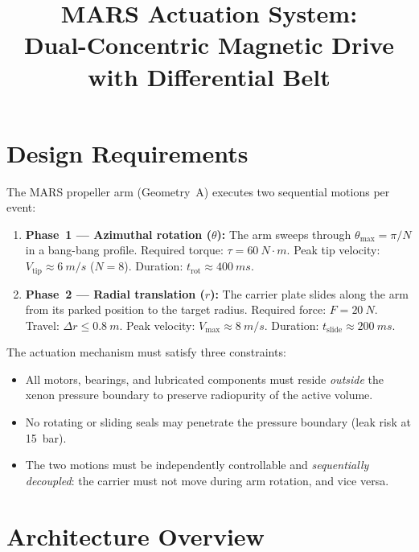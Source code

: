 \documentclass[11pt,a4paper]{article}
\title{MARS Actuation System:\\
       Dual-Concentric Magnetic Drive with Differential Belt}
\author{}
\date{}
\begin{document}
\maketitle

\section{Design Requirements}
\label{sec:requirements}

The MARS propeller arm (Geometry~A) executes two sequential motions per
event:
\begin{enumerate}[nosep]
  \item \textbf{Phase~1 --- Azimuthal rotation ($\theta$):}
        The arm sweeps through $\theta_\mathrm{max} = \pi/N$ in a
        bang-bang profile. Required torque: $\tau = \SI{60}{N\cdot m}$.
        Peak tip velocity: $V_\mathrm{tip} \approx \SI{6}{m/s}$
        ($N = 8$). Duration: $t_\mathrm{rot} \approx \SI{400}{ms}$.
  \item \textbf{Phase~2 --- Radial translation ($r$):}
        The carrier plate slides along the arm from its parked position
        to the target radius. Required force: $F = \SI{20}{N}$.
        Travel: $\Delta r \le \SI{0.8}{m}$. Peak velocity:
        $V_\mathrm{max} \approx \SI{8}{m/s}$.
        Duration: $t_\mathrm{slide} \approx \SI{200}{ms}$.
\end{enumerate}

The actuation mechanism must satisfy three constraints:
\begin{itemize}[nosep]
  \item All motors, bearings, and lubricated components must reside
        \emph{outside} the xenon pressure boundary to preserve
        radiopurity of the active volume.
  \item No rotating or sliding seals may penetrate the pressure
        boundary (leak risk at \SI{15}{bar}).
  \item The two motions must be independently controllable and
        \emph{sequentially decoupled}: the carrier must not move during
        arm rotation, and vice versa.
\end{itemize}


\section{Architecture Overview}
\label{sec:architecture}
\end{document}
